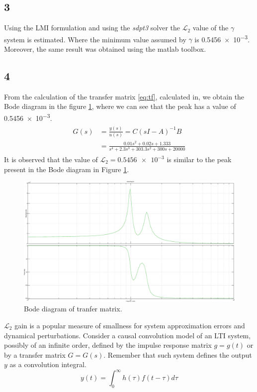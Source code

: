 \subsection{3}
Using the LMI formulation and using the \emph{sdpt3} solver the \(\mathcal{L}_{2}\)
value of the \(\gamma\) system is estimated.
Where the minimum value assumed by \(\gamma\) is \num{0.5456e-3}.
Moreover, the same result was obtained using the matlab toolbox.

\subsection{4}
From the calculation of the transfer matrix \eqref{eq:tf}, calculated in, we
obtain the Bode diagram in the figure \ref{fig:bodeplot}, where we can see that
the peak has a value of \num{0.5456e-3}.
\begin{align}
	\label{eq:tf}
	\begin{split}
		G(s) 	& = \frac{y(s)}{u(s)} = C(sI-A)^{-1}B\\
				& = \frac{0.01 s^2 + 0.02 s + 1.333}{s^4 + 2.3 s^3 + 303.3 s^2 + 300 s + 20000}
	\end{split}
\end{align}
It is observed that the value of \(\mathcal{L}_{2} = \num{0.5456e-3}\)  is
similar to the peak present in the Bode diagram in Figure \ref{fig:bodeplot}.
\begin{figure}[htb]
	\centering
	\includegraphics[width=0.75\linewidth]{bode}
	\caption{Bode diagram of tranfer matrix.}
	\label{fig:bodeplot}
\end{figure}
%
\(\mathcal{L}_{2}\) gain is a popular measure of smallness for system
approximation errors and dynamical perturbations.
Consider a causal convolution model of an LTI system, possibly of an
infinite order, defined by the impulse response matrix \(g = g(t)\) or by a
transfer matrix \(G = G(s)\).
Remember that such system defines the output \(y\) as a convolution integral.
\begin{equation}
	\label{eq:convintegral}
	y(t) = \int_{0}^{\infty} h(\tau)f(t-\tau)d\tau
\end{equation}
